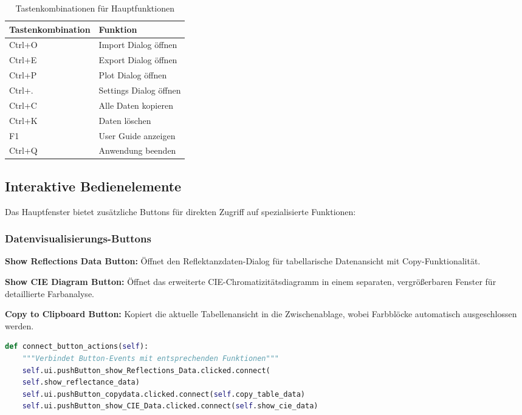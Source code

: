 \begin{table}[H]
\centering
\caption{Tastenkombinationen für Hauptfunktionen}
\label{tab:shortcuts}
\begin{tabular}{|l|l|}
\hline
\textbf{Tastenkombination} & \textbf{Funktion} \\
\hline
Ctrl+O & Import Dialog öffnen \\
Ctrl+E & Export Dialog öffnen \\
Ctrl+P & Plot Dialog öffnen \\
Ctrl+. & Settings Dialog öffnen \\
Ctrl+C & Alle Daten kopieren \\
Ctrl+K & Daten löschen \\
F1 & User Guide anzeigen \\
Ctrl+Q & Anwendung beenden \\
\hline
\end{tabular}
\end{table}

\subsection{Interaktive Bedienelemente}

Das Hauptfenster bietet zusätzliche Buttons für direkten Zugriff auf spezialisierte Funktionen:

\subsubsection{Datenvisualisierungs-Buttons}

\textbf{Show Reflections Data Button:} Öffnet den Reflektanzdaten-Dialog für tabellarische Datenansicht mit Copy-Funktionalität.

\textbf{Show CIE Diagram Button:} Öffnet das erweiterte CIE-Chromatizitätsdiagramm in einem separaten, vergrößerbaren Fenster für detaillierte Farbanalyse.

\textbf{Copy to Clipboard Button:} Kopiert die aktuelle Tabellenansicht in die Zwischenablage, wobei Farbblöcke automatisch ausgeschlossen werden.

\begin{lstlisting}[language=Python, caption=Button-Event-Verbindungen]
def connect_button_actions(self):
    """Verbindet Button-Events mit entsprechenden Funktionen"""
    self.ui.pushButton_show_Reflections_Data.clicked.connect(
    self.show_reflectance_data)
    self.ui.pushButton_copydata.clicked.connect(self.copy_table_data)
    self.ui.pushButton_show_CIE_Data.clicked.connect(self.show_cie_data)
\end{lstlisting}

